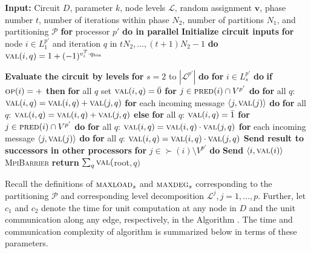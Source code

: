 \begin{algorithm}{}
\small
\caption{}
\label{alg:parEvaluate} 
\begin{algorithmic}[1]
\STATE \textbf{Input:} Circuit $D$, parameter $k$, node levels $\mathcal{L}$, 
random assignment $\mathbf{v}$, phase number $t$, number of iterations within phase $N_2$,
number of partitions $N_1$, and partitioning $\mathcal{P}$
\STATE
\STATE \textbf{for} processor $p'$ \textbf{do in parallel}
\STATE \quad \textbf{Initialize circuit inputs}
\STATE \quad \textbf{for} node $i \in L^{p'}_{1}$ and iteration $q$ in $tN_2,\ldots,(t+1)N_2-1$ \textbf{do}
\STATE \qquad $ \textsc{val}(i, q) = 1 + (-1)^{v_i^T \cdot q_{\text{bin}}}$

\STATE \quad \textbf{Evaluate the circuit by levels}
\STATE \quad \textbf{for} $s=2$ to $|\mathcal{L}^{p'}|$ \textbf{do}
\STATE \qquad \textbf{for} $i \in L_s^{p'}$ \textbf{do}
\STATE \qquad \quad \textbf{if} $\textsc{op}(i) = +$ \textbf{then}
\STATE \qquad \qquad \textbf{for} all $q$ set $\textsc{val}(i,q) = \bar 0$
\STATE \qquad \qquad \textbf{for} $j \in \textsc{pred}(i)\cap V^{p'}$  \textbf{do}
\STATE \qquad \qquad \quad \textbf{for} all $q$: $\textsc{val}(i, q) = \textsc{val}(i, q) + \textsc{val}(j, q)$
\STATE \qquad \qquad \textbf{for} each incoming message $\langle j, \textsc{val}(j)\rangle$ \textbf{do}
\STATE \qquad \qquad \quad \textbf{for} all $q$: $\textsc{val}(i, q) = \textsc{val}(i, q) + \textsc{val}(j, q)$
\STATE \qquad \quad \textbf{else} 
\STATE \qquad \qquad \textbf{for} all $q$: $\textsc{val}(i, q) = \bar 1$
\STATE \qquad \qquad \textbf{for} $j \in \textsc{pred}(i)\cap V^{p'}$ \textbf{do}
\STATE \qquad \qquad \quad \textbf{for} all $q$: $\textsc{val}(i, q) = \textsc{val}(i, q) \cdot \textsc{val}(j, q)$
\STATE \qquad \qquad \textbf{for} each incoming message $\langle j, \textsc{val}(j)\rangle$ \textbf{do}
\STATE \qquad \qquad \quad \textbf{for} all $q$: $\textsc{val}(i, q) = \textsc{val}(i, q) \cdot \textsc{val}(j, q)$
\STATE \qquad \quad  \textbf{Send result to successors in other processors}
\STATE \qquad \quad \textbf{for} $j \in \succ(i) \setminus V^{p'}$ \textbf{do}
\STATE \qquad \qquad \textbf{Send} $\langle i, \textsc{val}(i)\rangle$
\STATE \textsc{MpiBarrier}
\STATE \textbf{return} $\sum_q \textsc{val}($root$, q)$
\end{algorithmic}
\end{algorithm}

Recall the definitions of $\textsc{maxload}{}_s$ and $\textsc{maxdeg}{}_s$ corresponding to the partitioning
$\mathcal{P}$ and corresponding level decomposition $\mathcal{L}^j, j=1,\ldots,p$.
Further, let $c_1$ and $c_2$ denote the time for unit computation at any node in $D$
and the unit communication along any edge, respectively, in the Algorithm \parcircuit{}.
The time and communication complexity of algorithm \parmaxwt{} is summarized below
in terms of these parameters. 


